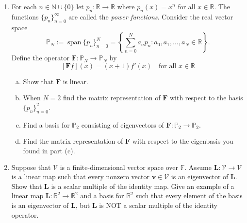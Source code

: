 \documentclass[12pt]{amsart}
\newcommand{\1}{\mathbbm{1}}
\numberwithin{equation}{section}
\numberwithin{Theorem}{section}
\theoremstyle{plain} %
\theoremstyle{definition}
\theoremstyle{remark}
\begin{document}
\thispagestyle{empty}

\bigskip


\begin{enumerate}[1.]

\item For each \(n\in\mathbb{N}\cup\{0\}\) let \(p_{n}:\mathbb{R}\to\mathbb{R}\) where \(p_{n}(x) = x^{n}\) for all \(x\in\mathbb{R}\). The functions \(\{p_{n}\}_{n=0}^{\infty}\) are called the \textit{power functions}. Consider the real vector space 
\[\mathbb{P}_{N}:=\operatorname{span}\{p_{n}\}_{n=0}^{N} = \left\{\sum_{n=0}^{N}a_{n}p_{n} : a_{0},a_{1},\ldots,a_{N}\in\mathbb{R}\right\}.\]
Define the operator \(\mathbf{F}:\mathbb{P}_{N}\to\mathbb{P}_{N}\) by \[[\mathbf{F}f](x) = (x+1)f'(x)\quad\text{for all }x\in\mathbb{R}\]

\medskip

\begin{enumerate}[(a)]

\item Show that \(\mathbf{F}\) is linear.\medskip

\item When \(N=2\) find the matrix representation of \(\mathbf{F}\) with respect to the basis \(\{p_{n}\}_{n=0}^{2}\).\medskip

\item Find a basis for \(\mathbb{P}_{2}\) consisting of eigenvectors of \(\mathbf{F}:\mathbb{P}_{2}\to\mathbb{P}_{2}\).\medskip

\item Find the matrix representation of \(\mathbf{F}\) with respect to the eigenbasis you found in part (c).\medskip

\end{enumerate}\bigskip


\item Suppose that \(\mathcal{V}\) is a finite-dimensional vector space over \(\mathbb{F}\). Assume \(\mathbf{L}:\mathcal{V}\to\mathcal{V}\) is a linear map such that every nonzero vector \(\mathbf{v}\in\mathcal{V}\) is an eigenvector of \(\mathbf{L}\). Show that \(\mathbf{L}\) is a scalar multiple of the identity map. Give an example of a linear map \(\mathbf{L}:\mathbb{R}^{2}\to\mathbb{R}^{2}\) and a basis for \(\mathbb{R}^{2}\) such that every element of the basis is an eigenvector of \(\mathbf{L}\), but \(\mathbf{L}\) is NOT a scalar multiple of the identity operator.

\bigskip


\end{enumerate}
\end{document}
